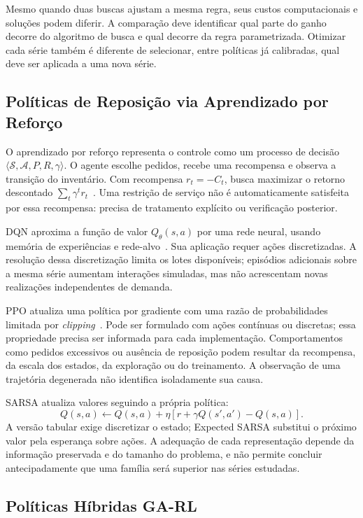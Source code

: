Mesmo quando duas buscas ajustam a mesma regra, seus custos computacionais e soluções podem diferir. A comparação deve identificar qual parte do ganho decorre do algoritmo de busca e qual decorre da regra parametrizada. Otimizar cada série também é diferente de selecionar, entre políticas já calibradas, qual deve ser aplicada a uma nova série.

\subsection{Políticas de Reposição via Aprendizado por Reforço}

O aprendizado por reforço representa o controle como um processo de decisão $\langle\mathcal S,\mathcal A,P,R,\gamma\rangle$. O agente escolhe pedidos, recebe uma recompensa e observa a transição do inventário. Com recompensa $r_t=-C_t$, busca maximizar o retorno descontado $\sum_t\gamma^t r_t$~\citep{SuttonBarto2018RL}. Uma restrição de serviço não é automaticamente satisfeita por essa recompensa: precisa de tratamento explícito ou verificação posterior.

DQN aproxima a função de valor $Q_\theta(s,a)$ por uma rede neural, usando memória de experiências e rede-alvo~\citep{Mnih2015DQN}. Sua aplicação requer ações discretizadas. A resolução dessa discretização limita os lotes disponíveis; episódios adicionais sobre a mesma série aumentam interações simuladas, mas não acrescentam novas realizações independentes de demanda.

PPO atualiza uma política por gradiente com uma razão de probabilidades limitada por \textit{clipping}~\citep{Schulman2017PPO}. Pode ser formulado com ações contínuas ou discretas; essa propriedade precisa ser informada para cada implementação. Comportamentos como pedidos excessivos ou ausência de reposição podem resultar da recompensa, da escala dos estados, da exploração ou do treinamento. A observação de uma trajetória degenerada não identifica isoladamente sua causa.

SARSA atualiza valores seguindo a própria política:
\[
Q(s,a)\leftarrow Q(s,a)+\eta[r+\gamma Q(s',a')-Q(s,a)].
\]
A versão tabular exige discretizar o estado; Expected SARSA substitui o próximo valor pela esperança sobre ações. A adequação de cada representação depende da informação preservada e do tamanho do problema, e não permite concluir antecipadamente que uma família será superior nas séries estudadas.

\subsection{Políticas Híbridas GA-RL}
\label{sec:ga_rl_arch}

